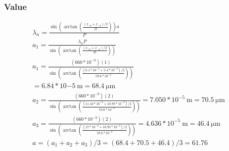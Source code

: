 \documentclass{report}
\begin{document}
\subsubsection*{Value}
$$
\begin{gathered}
\lambda_n=\frac{\sin \left(\arctan \left( \frac{(x_{+p} + x_{-p})/2}{D} \right)\right)a}{P} \\
a_1 = \frac{\lambda_n  P}{\sin \left(\arctan \left( \frac{(x_{+p} + x_{-p})/2}{D} \right)\right)} \\
a_1 = \frac{(660 * 10^{-9})(1)}{\sin \left(\arctan \left( \frac{(6.1*10^{-3} + 5.4*10^{-3})/2}{59.6*10^{-2}} \right)\right)} \\
=6.84*10{-5} \ \mathrm{m} = 68.4 \ \mathrm{\mu m}  \\
a_2  = \frac{(660 * 10^{-9})(2)}{\sin \left(\arctan \left( \frac{(11.43*10^{-3} + 10.89*10^{-3})/2}{59.6*10^{-2}} \right)\right)} =7.050*10^{-5} \ \mathrm{m} = 70.5 \ \mathrm{\mu m}\\
a_3  = \frac{(660 * 10^{-9})(2)}{\sin \left(\arctan \left( \frac{(17*10^{-3} + 16.95*10^{-3})/2}{59.6*10^{-2}} \right)\right)} =4.636*10^{-5} \ \mathrm{m} = 46.4 \ \mathrm{\mu m} \\
a = (a_1 + a_2 + a_3)/3 =  (68.4 + 70.5 + 46.4)/3=61.76 \\
\end{gathered}
$$
\end{document}
